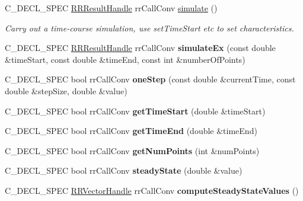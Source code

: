 \begin{DoxyCompactItemize}
\-C\-\_\-\-D\-E\-C\-L\-\_\-\-S\-P\-E\-C \hyperlink{struct_r_r_result}{\-R\-R\-Result\-Handle} \*
rr\-Call\-Conv \hyperlink{group__loadsave_ga9f0555c11716daec2336d54d13facc57}{simulate} ()
\begin{DoxyCompactList}\small\item\em \-Carry out a time-\/course simulation, use set\-Time\-Start etc to set characteristics. \end{DoxyCompactList}\item 
\hypertarget{group__loadsave_ga9b87919e79f6eb0d7c77c3daa08d6baf}{
\-C\-\_\-\-D\-E\-C\-L\-\_\-\-S\-P\-E\-C \hyperlink{struct_r_r_result}{\-R\-R\-Result\-Handle} \*
rr\-Call\-Conv {\bfseries simulate\-Ex} (const double \&time\-Start, const double \&time\-End, const int \&number\-Of\-Points)}
\label{group__loadsave_ga9b87919e79f6eb0d7c77c3daa08d6baf}

\item 
\hypertarget{group__loadsave_ga190fff177accdfbc9c192c4993807e2e}{
\-C\-\_\-\-D\-E\-C\-L\-\_\-\-S\-P\-E\-C bool rr\-Call\-Conv {\bfseries one\-Step} (const double \&current\-Time, const double \&step\-Size, double \&value)}
\label{group__loadsave_ga190fff177accdfbc9c192c4993807e2e}

\item 
\hypertarget{group__loadsave_ga18b4fbd0dc5aa3f25d58367a406f425c}{
\-C\-\_\-\-D\-E\-C\-L\-\_\-\-S\-P\-E\-C bool rr\-Call\-Conv {\bfseries get\-Time\-Start} (double \&time\-Start)}
\label{group__loadsave_ga18b4fbd0dc5aa3f25d58367a406f425c}

\item 
\hypertarget{group__loadsave_ga451e7ecddd0431316048a332410b0600}{
\-C\-\_\-\-D\-E\-C\-L\-\_\-\-S\-P\-E\-C bool rr\-Call\-Conv {\bfseries get\-Time\-End} (double \&time\-End)}
\label{group__loadsave_ga451e7ecddd0431316048a332410b0600}

\item 
\hypertarget{group__loadsave_gacd9cb734773710f640742a9f040dccc5}{
\-C\-\_\-\-D\-E\-C\-L\-\_\-\-S\-P\-E\-C bool rr\-Call\-Conv {\bfseries get\-Num\-Points} (int \&num\-Points)}
\label{group__loadsave_gacd9cb734773710f640742a9f040dccc5}

\item 
\hypertarget{group__loadsave_ga0edd5f5a66884e0767d855d639cb45c0}{
\-C\-\_\-\-D\-E\-C\-L\-\_\-\-S\-P\-E\-C bool rr\-Call\-Conv {\bfseries steady\-State} (double \&value)}
\label{group__loadsave_ga0edd5f5a66884e0767d855d639cb45c0}

\item 
\hypertarget{group__loadsave_ga95269e5d546721d19139d746d5ac8358}{
\-C\-\_\-\-D\-E\-C\-L\-\_\-\-S\-P\-E\-C \hyperlink{struct_r_r_vector}{\-R\-R\-Vector\-Handle} \*
rr\-Call\-Conv {\bfseries compute\-Steady\-State\-Values} ()}
\label{group__loadsave_ga95269e5d546721d19139d746d5ac8358}


\end{DoxyCompactItemize}

